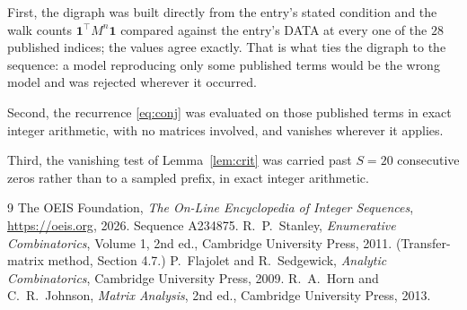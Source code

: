 \documentclass[11pt,a4paper]{article}
\theoremstyle{plain}
\theoremstyle{definition}
\begin{document}
First, the digraph was built directly from the entry's stated condition and the walk counts
$\mathbf{1}^{\!\top}M^{n}\mathbf{1}$ compared against the entry's DATA at every one of
the $28$ published indices; the values agree exactly. That is what ties the digraph to
the sequence: a model reproducing only some published terms would be the wrong model and
was rejected wherever it occurred.

Second, the recurrence \eqref{eq:conj} was evaluated on those published terms in exact
integer arithmetic, with no matrices involved, and vanishes wherever it applies.

Third, the vanishing test of Lemma~\ref{lem:crit} was carried past $S=20$ consecutive
zeros rather than to a sampled prefix, in exact integer arithmetic.

\begin{thebibliography}{9}
 The OEIS Foundation, \emph{The On-Line Encyclopedia of Integer
Sequences}, \url{https://oeis.org}, 2026. Sequence A234875.
 R.~P.~Stanley, \emph{Enumerative Combinatorics}, Volume 1, 2nd ed.,
Cambridge University Press, 2011. (Transfer-matrix method, Section 4.7.)
 P.~Flajolet and R.~Sedgewick, \emph{Analytic Combinatorics}, Cambridge
University Press, 2009.
 R.~A.~Horn and C.~R.~Johnson, \emph{Matrix Analysis}, 2nd ed., Cambridge
University Press, 2013.
\end{thebibliography}
\end{document}
